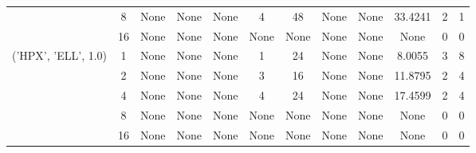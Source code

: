 \begin{tabular}{cccccccccccc}
& 8& None& None& None& 4& 48& None& None& 33.4241& 2& 1\\
& 16& None& None& None& None& None& None& None& None& 0& 0\\
\hline
\multirow{5}{*}{('HPX', 'ELL', 1.0)}& 1& None& None& None& 1& 24& None& None& 8.0055& 3& 8\\
& 2& None& None& None& 3& 16& None& None& 11.8795& 2& 4\\
& 4& None& None& None& 4& 24& None& None& 17.4599& 2& 4\\
& 8& None& None& None& None& None& None& None& None& 0& 0\\
& 16& None& None& None& None& None& None& None& None& 0& 0\\
\hline
\end{tabular}



